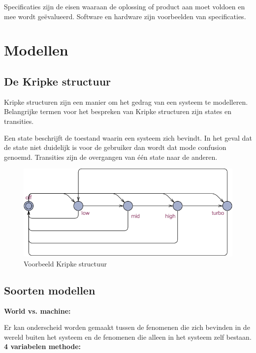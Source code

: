 \documentclass{article}
\begin{document}
Specificaties zijn de eisen waaraan de oplossing of product aan moet voldoen en mee wordt geëvalueerd. Software en hardware zijn voorbeelden van specificaties.

\section{Modellen}

\subsection{De Kripke structuur}

Kripke structuren zijn een manier om het gedrag van een systeem te modelleren. Belangrijke termen voor het bespreken van Kripke structuren zijn states en transities. \newline

Een state beschrijft de toestand waarin een systeem zich bevindt. In het geval dat de state niet duidelijk is voor de gebruiker dan wordt dat mode confusion genoemd. Transities zijn de overgangen van één state naar de anderen. 

\begin{figure}[!h]
	\centering
	\includegraphics[width=\textwidth]{kripke_structure_example1}
    \caption{Voorbeeld Kripke structuur}
\end{figure}

\subsection{Soorten modellen} \label{SoortenModellen}

\textbf{World vs. machine:} 

Er kan onderscheid worden gemaakt tussen de fenomenen die zich bevinden in de wereld buiten het systeem en de fenomenen die alleen in het systeem zelf bestaan. \newline
\textbf{4 variabelen methode:}
\end{document}
